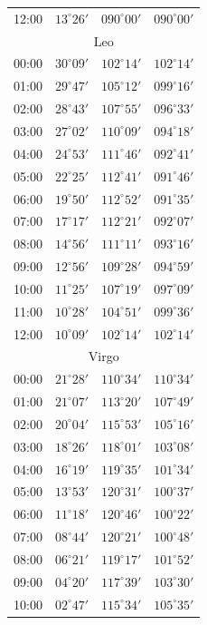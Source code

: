 \begin{table}[!h]
\begin{Parallel}{}{}
{{\begin{tabular}{l|lll}
12:00 & $13^\circ 26'$ & $090^\circ 00'$& $090^\circ 00'$ \\
\multicolumn{4}{c}{Leo}\\
00:00 & $30^\circ 09'$ & $102^\circ 14'$& $102^\circ 14'$ \\
01:00 & $29^\circ 47'$ & $105^\circ 12'$& $099^\circ 16'$ \\
02:00 & $28^\circ 43'$ & $107^\circ 55'$& $096^\circ 33'$ \\
03:00 & $27^\circ 02'$ & $110^\circ 09'$& $094^\circ 18'$ \\
04:00 & $24^\circ 53'$ & $111^\circ 46'$& $092^\circ 41'$ \\
05:00 & $22^\circ 25'$ & $112^\circ 41'$& $091^\circ 46'$ \\
06:00 & $19^\circ 50'$ & $112^\circ 52'$& $091^\circ 35'$ \\
07:00 & $17^\circ 17'$ & $112^\circ 21'$& $092^\circ 07'$ \\
08:00 & $14^\circ 56'$ & $111^\circ 11'$& $093^\circ 16'$ \\
09:00 & $12^\circ 56'$ & $109^\circ 28'$& $094^\circ 59'$ \\
10:00 & $11^\circ 25'$ & $107^\circ 19'$& $097^\circ 09'$ \\
11:00 & $10^\circ 28'$ & $104^\circ 51'$& $099^\circ 36'$ \\
12:00 & $10^\circ 09'$ & $102^\circ 14'$& $102^\circ 14'$ \\
\multicolumn{4}{c}{Virgo}\\
00:00 & $21^\circ 28'$ & $110^\circ 34'$& $110^\circ 34'$ \\
01:00 & $21^\circ 07'$ & $113^\circ 20'$& $107^\circ 49'$ \\
02:00 & $20^\circ 04'$ & $115^\circ 53'$& $105^\circ 16'$ \\
03:00 & $18^\circ 26'$ & $118^\circ 01'$& $103^\circ 08'$ \\
04:00 & $16^\circ 19'$ & $119^\circ 35'$& $101^\circ 34'$ \\
05:00 & $13^\circ 53'$ & $120^\circ 31'$& $100^\circ 37'$ \\
06:00 & $11^\circ 18'$ & $120^\circ 46'$& $100^\circ 22'$ \\
07:00 & $08^\circ 44'$ & $120^\circ 21'$& $100^\circ 48'$ \\
08:00 & $06^\circ 21'$ & $119^\circ 17'$& $101^\circ 52'$ \\
09:00 & $04^\circ 20'$ & $117^\circ 39'$& $103^\circ 30'$ \\
10:00 & $02^\circ 47'$ & $115^\circ 34'$& $105^\circ 35'$ \\

\end{tabular}}}
\end{Parallel}
\end{table}
